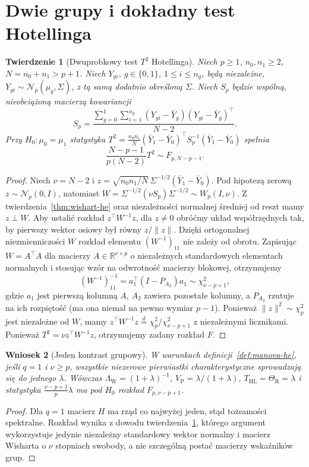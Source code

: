\documentclass[11pt,a4paper,oneside]{report}
\numberwithin{equation}{chapter}
\theoremstyle{plain}
\newtheorem{twierdzenie}{Twierdzenie}[chapter]
\newtheorem{wniosek}[twierdzenie]{Wniosek}
\theoremstyle{definition}
\theoremstyle{remark}
\newcommand{\R}{\mathbb R}
\newcommand{\Normal}{\mathcal N}
\begin{document}
\section{Dwie grupy i dokładny test Hotellinga}
\begin{twierdzenie}[Dwuprobkowy test $T^2$ Hotellinga]\label{thm:hotelling-two-sample}
Niech $p\ge1$, $n_0,n_1\ge2$, $N=n_0+n_1>p+1$. Niech $Y_{gi}$, $g\in\{0,1\}$, $1\le i\le n_g$, będą niezależne, $Y_{gi}\sim\Normal_p(\mu_g,\Sigma)$, z tą samą dodatnio określoną $\Sigma$. Niech $S_p$ będzie wspólną, nieobciążoną macierzą kowariancji
\[
 S_p=\frac{\sum_{g=0}^1\sum_{i=1}^{n_g}(Y_{gi}-\bar Y_g)(Y_{gi}-\bar Y_g)^\top}{N-2}.
\]
Przy $H_0:\mu_0=\mu_1$ statystyka $T^2=\frac{n_0n_1}{N}(\bar Y_1-\bar Y_0)^\top S_p^{-1}(\bar Y_1-\bar Y_0)$ spełnia
\[
 \frac{N-p-1}{p(N-2)}T^2\sim F_{p,N-p-1}.
\]
\end{twierdzenie}
\begin{proof}
Niech $\nu=N-2$ i $z=\sqrt{n_0n_1/N}\,\Sigma^{-1/2}(\bar Y_1-\bar Y_0)$. Pod hipotezą zerową $z\sim\Normal_p(0,I)$, natomiast $W=\Sigma^{-1/2}(\nu S_p)\Sigma^{-1/2}\sim W_p(I,\nu)$. Z twierdzenia~\ref{thm:wishart-he} oraz niezależności normalnej średniej od reszt mamy $z\perp W$. Aby ustalić rozkład $z^\top W^{-1}z$, dla $z\ne0$ obróćmy układ współrzędnych tak, by pierwszy wektor osiowy był równy $z/\|z\|$. Dzięki ortogonalnej niezmienniczości $W$ rozkład elementu $(W^{-1})_{11}$ nie zależy od obrotu. Zapisując $W=A^\top A$ dla macierzy $A\in\R^{\nu\times p}$ o niezależnych standardowych elementach normalnych i stosując wzór na odwrotność macierzy blokowej, otrzymujemy
\[
 (W^{-1})_{11}^{-1}=a_1^\top(I-P_{A_2})a_1\sim\chi^2_{\nu-p+1},
\]
gdzie $a_1$ jest pierwszą kolumną $A$, $A_2$ zawiera pozostałe kolumny, a $P_{A_2}$ rzutuje na ich rozpiętość (ma ona niemal na pewno wymiar $p-1$). Ponieważ $\|z\|^2\sim\chi^2_p$ jest niezależne od $W$, mamy $z^\top W^{-1}z\stackrel d=\chi_p^2/\chi_{\nu-p+1}^2$ z niezależnymi licznikami. Ponieważ $T^2=\nu z^\top W^{-1}z$, otrzymujemy zadany rozkład $F$.
\end{proof}

\begin{wniosek}[Jeden kontrast grupowy]\label{cor:manova-rankone}
W warunkach definicji~\ref{def:manova-he}, jeśli $q=1$ i $\nu\ge p$, wszystkie niezerowe pierwiastki charakterystyczne sprowadzają się do jednego $\lambda$. Wówczas $\Lambda_{\mathrm W}=(1+\lambda)^{-1}$, $V_{\mathrm P}=\lambda/(1+\lambda)$, $T_{\mathrm{HL}}=\Theta_{\mathrm R}=\lambda$ i statystyka $\frac{\nu-p+1}{p}\lambda$ ma pod $H_0$ rozkład $F_{p,\nu-p+1}$.
\end{wniosek}
\begin{proof}
Dla $q=1$ macierz $H$ ma rząd co najwyżej jeden, stąd tożsamości spektralne. Rozkład wynika z dowodu twierdzenia~\ref{thm:hotelling-two-sample}, którego argument wykorzystuje jedynie niezależny standardowy wektor normalny i macierz Wisharta o $\nu$ stopniach swobody, a nie szczególną postać macierzy wskaźników grup.
\end{proof}
\end{document}
